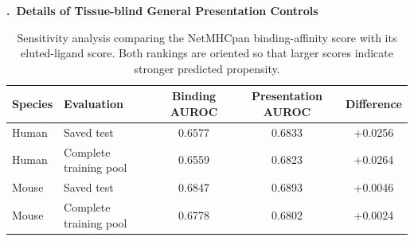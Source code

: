 \clearpage
{}
\begin{table}[!t]
\raggedright
{\large\bfseries \thesection.\ Details of Tissue-blind General Presentation Controls\par}
\vspace{0.4\baselineskip}
\begin{minipage}[t]{\columnwidth}
\caption{Sensitivity analysis comparing the NetMHCpan binding-affinity score with its eluted-ligand score. Both rankings are oriented so that larger scores indicate stronger predicted propensity.}
\label{tab:appendix-netmhcpan-el-ba}
\fontsize{7.5}{8.5}\selectfont
\setlength{\tabcolsep}{1.5pt}
\begin{tabularx}{\columnwidth}{@{}l>{\raggedright\arraybackslash}Xccc@{}}
\toprule
Species & Evaluation & Binding AUROC & Presentation AUROC & Difference \\
\midrule
Human & Saved test & 0.6577 & 0.6833 & +0.0256 \\
Human & Complete training pool & 0.6559 & 0.6823 & +0.0264 \\
Mouse & Saved test & 0.6847 & 0.6893 & +0.0046 \\
Mouse & Complete training pool & 0.6778 & 0.6802 & +0.0024 \\
\bottomrule
\end{tabularx}
\end{minipage}


\end{table}
